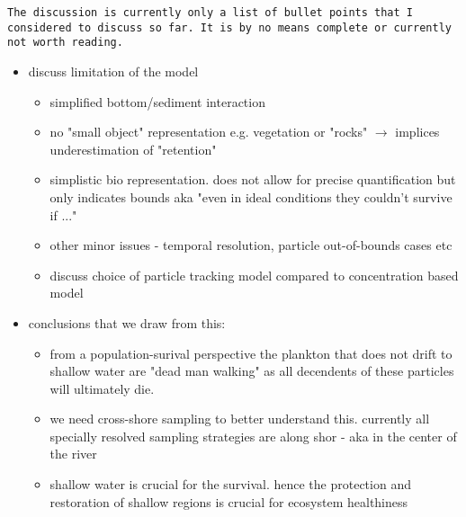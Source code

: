 \texttt{The discussion is currently only a list of bullet points that I considered to discuss so far. It is by no means complete or currently not worth reading.}
\begin{itemize}
    \item discuss limitation of the model
    \begin{itemize}
        \item simplified bottom/sediment interaction
        \item no "small object" representation e.g. vegetation or "rocks" $\rightarrow$ implices underestimation of "retention"
        \item simplistic bio representation. does not allow for precise quantification but only indicates bounds aka "even in ideal conditions they couldn't survive if ..."
        \item other minor issues - temporal resolution, particle out-of-bounds cases etc
        \item discuss choice of particle tracking model compared to concentration based model
    \end{itemize}
    \item conclusions that we draw from this:
    \begin{itemize}
        \item from a population-surival perspective the plankton that does not drift to shallow water are "dead man walking" as all decendents of these particles will ultimately die.
        \item we need cross-shore sampling to better understand this. currently all specially resolved sampling strategies are along shor - aka in the center of the river
        \item shallow water is crucial for the survival. hence the protection and restoration of shallow regions is crucial for ecosystem healthiness
    \end{itemize}
\end{itemize}